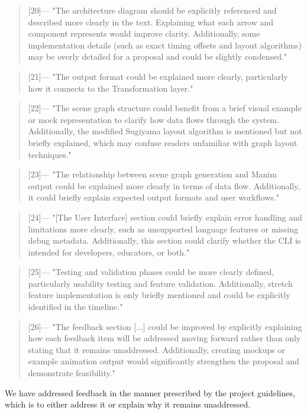 \begin{quotation} [20]---%
  "The architecture diagram should be explicitly referenced and described more clearly in the text. Explaining what each arrow and component represents would improve clarity. Additionally, some implementation details (such as exact timing offsets and layout algorithms) may be overly detailed for a proposal and could be slightly condensed."
\end{quotation}

\begin{quotation} [21]---%
  "The output format could be explained more clearly, particularly how it connects to the Transformation layer."
\end{quotation}

\begin{quotation} [22]---%
  "The scene graph structure could benefit from a brief visual example or mock representation to clarify how data flows through the system. Additionally, the modified Sugiyama layout algorithm is mentioned but not briefly explained, which may confuse readers unfamiliar with graph layout techniques."
\end{quotation}

\begin{quotation} [23]---%
  "The relationship between scene graph generation and Manim output could be explained more clearly in terms of data flow. Additionally, it could briefly explain expected output formats and user workflows."
\end{quotation}

\begin{quotation} [24]---%
  "[The User Interface] section could briefly explain error handling and limitations more clearly, such as unsupported language features or missing debug metadata. Additionally, this section could clarify whether the CLI is intended for developers, educators, or both."
\end{quotation}

\begin{quotation} [25]---%
  "Testing and validation phases could be more clearly defined, particularly usability testing and feature validation. Additionally, stretch feature implementation is only briefly mentioned and could be explicitly identified in the timeline."
\end{quotation}

\begin{quotation} [26]---%
  "The feedback section [...] could be improved by explicitly explaining how each feedback item will be addressed moving forward rather than only stating that it remains unaddressed. Additionally, creating mockups or example animation output would significantly strengthen the proposal and demonstrate feasibility."
\end{quotation}
\noindent We have addressed feedback in the manner prescribed by the project guidelines, which is to either address it or explain why it remains unaddressed.

